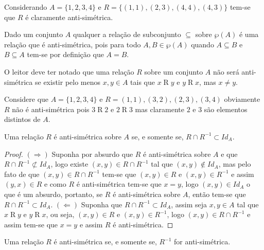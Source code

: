 \begin{example}
	Considerando $A = \{1,2,3,4\}$ e $R = \{(1,1), (2,3), (4,4), (4,3)\}$ tem-se que $R$ é claramente anti-simétrica.
\end{example}

\begin{example}
	Dado um conjunto $A$ qualquer a relação de subconjunto $\subseteq$ sobre $\wp(A)$ é uma relação que é anti-simétrica, pois para todo $A, B \in \wp(A)$ quando $A \subseteq B$ e $B \subseteq A$ tem-se por definição que $A = B$.
\end{example}

O leitor deve ter notado que uma relação $R$ sobre um conjunto $A$ não será anti-simétrica se existir pelo menos $x,y \in A$ tais que $x \mathrel{R} y$ e $y \mathrel{R} x$, mas $x \neq y$. 

\begin{example}
	Considere que $A = \{1,2,3,4\}$ e $R = {(1,1), (3,2), (2,3), (3,4)}$ obviamente $R$ não é anti-simétrica pois $3 \mathrel{R} 2$ e $2 \mathrel{R} 3$ mas claramente $2$ e $3$ são elementos distintos de $A$. 
\end{example}

\begin{theorem}\label{teo:CaracterizacaoRelacaoAntiSimetricas}
	Uma relação $R$ é anti-simétrica sobre $A$ se, e somente se, $R \cap R^{-1} \subset Id_A$.
\end{theorem}

\begin{proof}
	$(\Rightarrow)$ Suponha por absurdo que $R$ é anti-simétrica sobre $A$ e que  $R \cap R^{-1} \not\subset Id_A$, logo existe $(x, y) \in R \cap R^{-1}$ tal que $(x, y) \notin Id_A$, mas pelo fato de que $(x, y) \in R \cap R^{-1}$ tem-se que $(x, y) \in R$ e $(x, y) \in R^{-1}$ e assim $(y, x) \in R$ e como $R$ é anti-simétrica tem-se que $x = y$, logo $(x, y) \in Id_A$ o que é um absurdo, portanto, se $R$ é anti-simétrica sobre $A$, então tem-se que $R \cap R^{-1} \subset Id_A$. $(\Leftarrow)$ Suponha que $R \cap R^{-1} \subset Id_A$, assim seja $x, y \in A$ tal que $x \mathrel{R} y$ e $y \mathrel{R} x$, ou seja, $(x, y) \in R$ e $(x, y) \in R^{-1}$, logo $(x, y) \in R \cap R^{-1}$ e assim tem-se que $x = y$ e assim $R$ é anti-simétrica.
\end{proof}

\begin{corollary}
	Uma relação $R$ é anti-simétrica se, e somente se, $R^{-1}$ for anti-simétrica.
\end{corollary}


